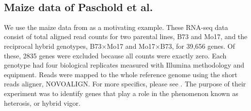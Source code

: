 \begin{table}[ht]
\centering
\begin{minipage}{.8\textwidth}
\caption{\small Selected rows from RNA-seq data set showing total aligned read counts for selected genes. Columns are grouped by genotype. Genes were selected as exemplars for different types of heterosis.}
\label{counts}
\end{minipage}
\\[.25cm]
\end{table}
% 
\subsection{Maize data of Paschold et al.}
\label{intro-paschold}
We use the maize data from \citep{paschold} as a motivating example. These RNA-seq data consist of total aligned read counts for two parental lines, B73 and Mo17, and the reciprocal hybrid genotypes, B73$\times$Mo17 and Mo17$\times$B73, for 39,656 genes. Of these, 2835 genes were excluded because all counts were exactly zero. Each genotype had four biological replicates measured with Illumina methodology and equipment. Reads were mapped to the whole reference genome using the short reads aligner, NOVOALIGN. For more specifics, please see \cite{paschold}. The purpose of their experiment was to identify genes that play a role in the phenomenon known as heterosis, or hybrid vigor.

